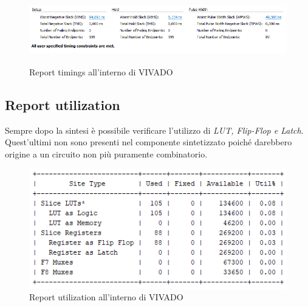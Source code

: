 \documentclass{article}
\begin{document}
\begin{figure}[H]
\centerline{\includegraphics[height=3cm]{timing.PNG}}
\centering
\caption{Report timings all'interno di VIVADO}
\centering
\end{figure}

\subsection{Report utilization}
Sempre dopo la sintesi è possibile verificare l'utilizzo di \textit{LUT, Flip-Flop e Latch}. Quest'ultimi non sono presenti nel componente sintetizzato poiché darebbero origine a un circuito non più puramente combinatorio.

\begin{figure}[H]
\includegraphics{utilization.PNG}
\centering
\caption{Report utilization all'interno di VIVADO}
\centering
\end{figure}
\end{document}
